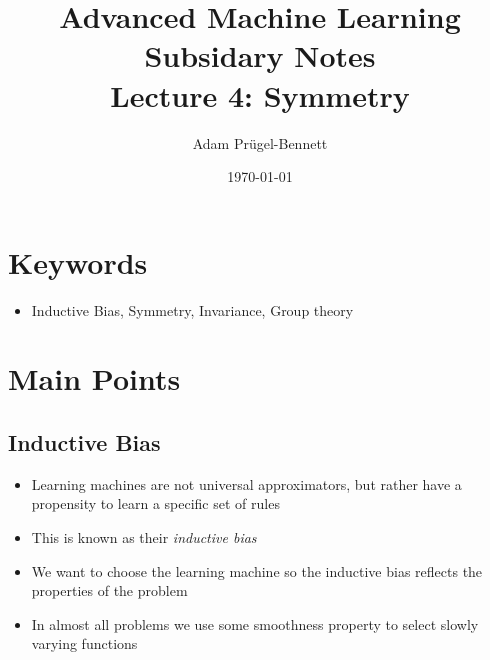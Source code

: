 \documentclass[11pt]{article}
\author{Adam Prügel-Bennett}
\date{\today}
\title{Advanced Machine Learning Subsidary Notes\\\medskip
\large Lecture 4: Symmetry}
\begin{document}
\maketitle

\section{Keywords}
\label{sec:orgf197648}
\begin{itemize}
\item Inductive Bias, Symmetry, Invariance, Group theory
\end{itemize}

\section{Main Points}
\label{sec:org26c9e2b}

\subsection{Inductive Bias}
\label{sec:org0e30ab9}
\begin{itemize}
\item Learning machines are not universal approximators, but rather have a propensity
to learn a specific set of rules
\item This is known as their \emph{inductive bias}
\item We want to choose the learning machine so the inductive bias reflects the properties
of the problem
\item In almost all problems we use some smoothness property to select slowly varying 
functions
\end{itemize}
\end{document}
